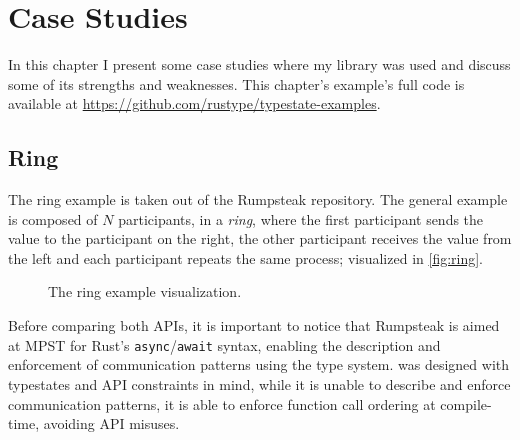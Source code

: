 

\chapter{Case Studies}\label{cha:case-study}

In this chapter I present some case studies where my library was used and discuss some of its strengths and weaknesses.
This chapter's example's full code is available at \url{https://github.com/rustype/typestate-examples}.

\section{Ring}\label{sec:case-study:ring}

The ring example is taken out of the Rumpsteak \autocite{Cutner2021} repository.
The general example is composed of $N$ participants, in a \emph{ring},
where the first participant sends the value to the participant on the right,
the other participant receives the value from the left and each participant repeats the same process;
visualized in \autoref{fig:ring}.

\begin{figure}
    \centering
    \caption{The ring example visualization.}
    \label{fig:ring}
\end{figure}

Before comparing both APIs, it is important to notice that Rumpsteak is aimed at \gls{MPST}
for Rust's \texttt{async}/\texttt{await} syntax,
enabling the description and enforcement of communication patterns using the type system.
\textcolor{attrgreen}{} was designed with typestates and API constraints in mind,
while it is unable to describe and enforce communication patterns,
it is able to enforce function call ordering at compile-time, avoiding API misuses.

